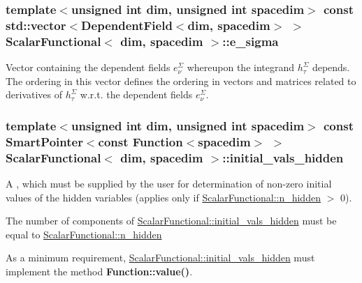 \subsubsection[{\texorpdfstring{e\+\_\+sigma}{e_sigma}}]{\setlength{\rightskip}{0pt plus 5cm}template$<$unsigned int dim, unsigned int spacedim$>$ const std\+::vector$<${\bf Dependent\+Field}$<$dim, spacedim$>$ $>$ {\bf Scalar\+Functional}$<$ dim, spacedim $>$\+::e\+\_\+sigma}\hypertarget{class_scalar_functional_a86662b03a63219227993a2c6c07aefc1}{}\label{class_scalar_functional_a86662b03a63219227993a2c6c07aefc1}
Vector containing the dependent fields $e^\Sigma_\nu$ whereupon the integrand $h^\Sigma_\tau$ depends. The ordering in this vector defines the ordering in vectors and matrices related to derivatives of $h^\Sigma_\tau$ w.\+r.\+t. the dependent fields $e^\Sigma_\nu$. 
\subsubsection[{\texorpdfstring{initial\+\_\+vals\+\_\+hidden}{initial_vals_hidden}}]{\setlength{\rightskip}{0pt plus 5cm}template$<$unsigned int dim, unsigned int spacedim$>$ const {\bf Smart\+Pointer}$<$const {\bf Function}$<$spacedim$>$ $>$ {\bf Scalar\+Functional}$<$ dim, spacedim $>$\+::initial\+\_\+vals\+\_\+hidden}\hypertarget{class_scalar_functional_a602d0bc2c945822c6b756fc63183ae2b}{}\label{class_scalar_functional_a602d0bc2c945822c6b756fc63183ae2b}
A {}, which must be supplied by the user for determination of non-\/zero initial values of the hidden variables (applies only if \hyperlink{class_scalar_functional_a8b1617930242870f22eef5e306cb717f}{Scalar\+Functional\+::n\+\_\+hidden} $>$ 0).

The number of components of \hyperlink{class_scalar_functional_a602d0bc2c945822c6b756fc63183ae2b}{Scalar\+Functional\+::initial\+\_\+vals\+\_\+hidden} must be equal to \hyperlink{class_scalar_functional_a8b1617930242870f22eef5e306cb717f}{Scalar\+Functional\+::n\+\_\+hidden}

As a minimum requirement, \hyperlink{class_scalar_functional_a602d0bc2c945822c6b756fc63183ae2b}{Scalar\+Functional\+::initial\+\_\+vals\+\_\+hidden} must implement the method {\bf Function\+::value()}. 
